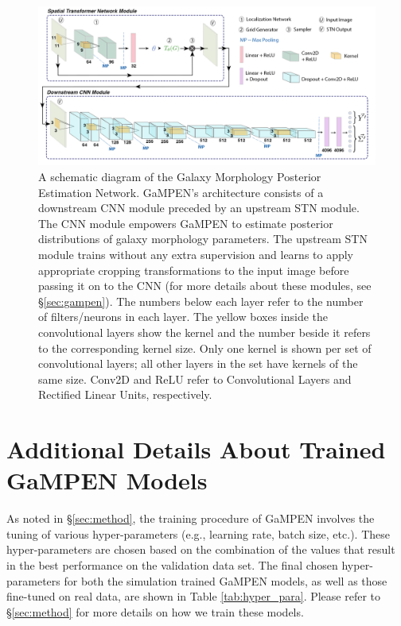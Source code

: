 \documentclass[linenumbers,twocolumn,twocolappendix]{aastex631}
\newcommand\gampen{GaMPEN}
\begin{document}
\begin{CJK*}{UTF8}{gbsn}
\begin{figure}[htb]
    \centering
    \includegraphics[width
    =\textwidth]{gampen_schematic.png}
    \caption{A schematic diagram of the Galaxy Morphology Posterior Estimation Network. \gampen's architecture consists of a downstream CNN module preceded by an upstream STN module. The CNN module empowers \gampen{} to estimate posterior distributions of galaxy morphology parameters. The upstream STN module trains without any extra supervision and learns to apply appropriate cropping transformations to the input image before passing it on to the CNN (for more details about these modules, see \S \ref{sec:gampen}).
    The numbers below each layer refer to the number of filters/neurons in each layer. The yellow boxes inside the convolutional layers show the kernel and the number beside it refers to the corresponding kernel size. Only one kernel is shown per set of convolutional layers; all other layers in the set have kernels of the same size. Conv2D and ReLU refer to Convolutional Layers and Rectified Linear Units, respectively.}
    \label{fig:gampen_schematic}
\end{figure}

\section{Additional Details About Trained \gampen{} Models}\label{ap:sec:trained_models}

As noted in \S \ref{sec:method}, the training procedure of \gampen{} involves the tuning of various hyper-parameters (e.g., learning rate, batch size, etc.). These hyper-parameters are chosen based on the combination of the values that result in the best performance on the validation data set. The final chosen hyper-parameters for both the simulation trained \gampen{} models, as well as those fine-tuned on real data, are shown in Table \ref{tab:hyper_para}. Please refer to \S \ref{sec:method} for more details on how we train these models.



\end{CJK*}
\end{document}
